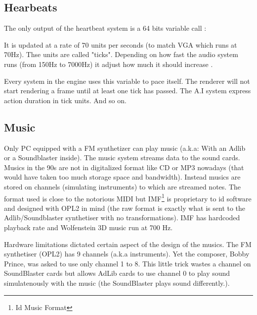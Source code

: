 \subsection{Hearbeats}

The only output of the heartbeat system is a 64 bits variable call :\\
\par
\begin{minipage}{\textwidth}

\end{minipage}
\par
It is updated at a rate of 70 units per seconds (to match VGA which runs at 70Hz). Thse units are called "ticks". Depending on how fast the audio system runs (from 150Hz to 7000Hz) it adjust how much it should increase .\\
\par
Every system in the engine uses this variable to pace itself. The renderer will not start rendering a frame until at least one tick has passed. The A.I system express action duration in tick units. And so on.\\


\subsection{Music}
Only PC equipped with a FM synthetizer can play music (a.k.a: With an Adlib or a Soundblaster inside). The music system streams data to the sound cards.  Musics in the 90s are not in digitalized format like CD or MP3 nowadays (that would have taken too much storage space and bandwidth). Instead musics are stored on channels (simulating instruments) to which are streamed notes. The format used is close to the notorious MIDI but IMF\footnote{Id Music Format} is proprietary to id software and designed with OPL2 in mind (the raw format is exactly what is sent to the Adlib/Soundblaster synthetiser with no transformations). IMF has hardcoded playback rate and Wolfenstein 3D music run at 700 Hz.\\
\par
Hardware limitations dictated certain aspect of the design of the musics. The FM synthetiser (OPL2) has 9 channels (a.k.a instruments). Yet the composer, Bobby Prince, was asked to use only channel 1 to 8. This little trick wastes a channel on SoundBlaster cards but allows AdLib cards to use channel 0 to play sound simulatenously with the music (the SoundBlaster plays sound differently.).\\









